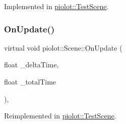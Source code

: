 Implemented in \mbox{\hyperlink{classpiolot_1_1_test_scene_aeaccbb83f264fb4f1e8df5b246033f76}{piolot\+::\+Test\+Scene}}.

\mbox{\label{group___virtual_gae05b812e9f1caa80526a79a03ab456e1}} 
\subsubsection{\texorpdfstring{On\+Update()}{OnUpdate()}}
{\footnotesize\ttfamily virtual void piolot\+::\+Scene\+::\+On\+Update (\begin{DoxyParamCaption}\item[{float}]{\+\_\+delta\+Time,  }\item[{float}]{\+\_\+total\+Time }\end{DoxyParamCaption})\hspace{0.3cm}{\ttfamily [inline]}, {\ttfamily [virtual]}}



Reimplemented in \mbox{\hyperlink{classpiolot_1_1_test_scene_a1151c075257a2b626774502709e0aab9}{piolot\+::\+Test\+Scene}}.

